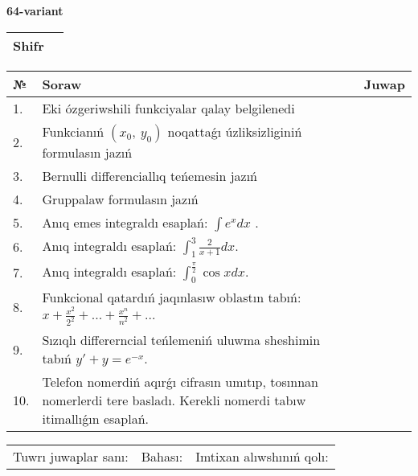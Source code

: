 \documentclass{article}
\begin{document}
  \egroup
  
  \newpage
  
  
  \textbf{64-variant}\\
  
  \bgroup
  \def\arraystretch{1.6} %
  
  \begin{tabular}{|m{5.7cm}|m{9.5cm}|}
  \hline
  Shifr & \\
  \hline
  \end{tabular}
  
  \vspace{1cm}
  
  \begin{tabular}{|m{0.7cm}|m{10cm}|m{4cm}|}
  \hline
  № & Soraw & Juwap \\
  \hline
  1. & Eki ózgeriwshili funkciyalar qalay belgilenedi &  \\
  \hline
  2. & Funkcianıń \((x_{0},\ y_{0})\) noqattaǵı úzliksizliginiń formulasın jazıń &  \\
  \hline
  3. & Bernulli differenciallıq teńemesin jazıń &  \\
  \hline
  4. & Gruppalaw formulasın jazıń &  \\
  \hline
  5. & Anıq emes integraldı esaplań: \(\int{e^{x}dx}\) . &  \\
  \hline
  6. & Anıq integraldı esaplań: \(\int_{1}^{3}\frac{2}{x + 1}dx\). &  \\
  \hline
  7. & Anıq integraldı esaplań: \(\int_{0}^{\frac{\pi}{2}}{\cos xdx}\). &  \\
  \hline
  8. & Funkcional qatardıń jaqınlasıw oblastın tabıń: \(x + \frac{x^2 }{2^2 } + ... + \frac{x^{n}}{n^2 } + ...\) &  \\
  \hline
  9. & Sızıqlı differerncial teńlemeniń uluwma sheshimin tabıń \(y' + y = e^{- x}\). &  \\
  \hline
  10. & Telefon nomerdiń aqırǵı cifrasın umıtıp, tosınnan nomerlerdi tere basladı. Kerekli nomerdi tabıw itimallıǵın esaplań. &  \\
  \hline
  \end{tabular}
  
  \vspace{1cm}
  
  \begin{tabular}{lll}
  Tuwrı juwaplar sanı: \underline{\hspace{1.5cm}} & 
  Bahası: \underline{\hspace{1.5cm}} & 
  Imtixan alıwshınıń qolı: \underline{\hspace{2cm}} \\
  \end{tabular}
  
\end{document}
